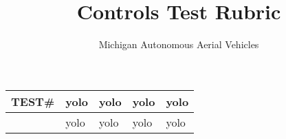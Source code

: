 \documentclass[]{article}
\title{Controls Test Rubric}
\author{Michigan Autonomous Aerial Vehicles}
\begin{document}
\maketitle

\begin{abstract}

\end{abstract}

\begin{tabular}{
p{}|
p{}|
p{}|
p{}|
p{}|
}
\hline
\hline 
\multicolumn{1}{|c|}{TEST\#} & yolo & yolo & yolo & yolo \\
\hline 
     & yolo & yolo & yolo & yolo \\
\cline{2-5} 
\end{tabular}
\end{document}
